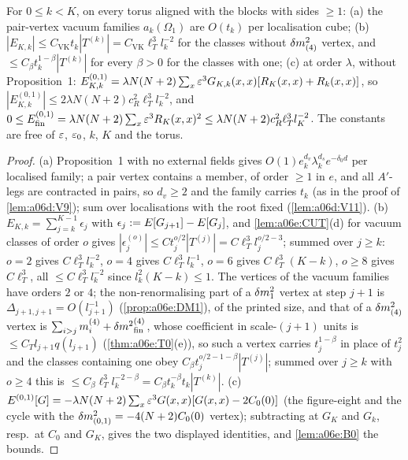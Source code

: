 \begin{theorem}\label{thm:a06e:VK}
For $0\le k<K$, on every torus aligned with the blocks with sides $\ge1$: \textup{(a)} the pair-vertex vacuum families $a_k(\Omega_1)$ are $O(t_k)$ per localisation cube; \textup{(b)} $|E_{K,k}|\le C_{\mathrm{VK}}t_k|T^{(k)}|=C_{\mathrm{VK}}\ell_T^3l_k^{-2}$ for the classes without $\delta m^2_{(4)}$ vertex, and $\le C_\beta t_k^{1-\beta}|T^{(k)}|$ for every $\beta>0$ for the classes with one; \textup{(c)} at order $\lambda$, without Proposition~1: $E^{(0,1)}_{K,k}=\lambda N(N+2)\sum_x\varepsilon^3G_{K,k}(x,x)[R_K(x,x)+R_k(x,x)]$, so $|E^{(0,1)}_{K,k}|\le2\lambda N(N+2)c_R^2\ell_T^3l_k^{-2}$, and $0\le E_{\mathrm{fin}}^{(0,1)}=\lambda N(N+2)\sum_x\varepsilon^3R_K(x,x)^2\le\lambda N(N+2)c_R^2\ell_T^3l_K^{-2}$. The constants are free of $\varepsilon$, $\varepsilon_0$, $k$, $K$ and the torus.
\end{theorem}

\begin{proof}
(a) Proposition~1 with no external fields gives $O(1)e_k^{d_v}\lambda_k^{d_s}e^{-\delta_0d}$ per localised family; a pair vertex contains a \cite[(1.14)]{Ba3} member, of order $\ge1$ in $e$, and all $A'$-legs are contracted in pairs, so $d_v\ge2$ and the family carries $t_k$ (as in the proof of \cref{lem:a06d:V9}); sum over localisations with the root fixed (\cref{lem:a06d:V11}). (b) $E_{K,k}=\sum_{j=k}^{K-1}\epsilon_j$ with $\epsilon_j:= E[G_{j+1}]-E[G_j]$, and \cref{lem:a06e:CUT}(d) for vacuum classes of order $o$ gives $|\epsilon^{(o)}_j|\le Ct_j^{o/2}|T^{(j)}|=C\ell_T^3l_j^{o/2-3}$; summed over $j\ge k$: $o=2$ gives $C\ell_T^3l_k^{-2}$, $o=4$ gives $C\ell_T^3l_k^{-1}$, $o=6$ gives $C\ell_T^3(K-k)$, $o\ge8$ gives $C\ell_T^3$, all $\le C\ell_T^3l_k^{-2}$ since $l_k^2(K-k)\le1$. The \cite[(1.7)]{Ba3} vertices of the vacuum families have orders $2$ or $4$; the non-renormalising part of a $\delta m^2_1$ vertex at step $j+1$ is $\Delta_{j+1,j+1}=O(l_{j+1}^{-1})$ (\cref{prop:a06e:DM1}), of the printed size, and that of a $\delta m^2_{(4)}$ vertex is $\sum_{i>j}m^{(4)}_i+{\delta m^2}^{(4)}_{\mathrm{fin}}$, whose coefficient in scale-$(j+1)$ units is $\le C_Tl_{j+1}q(l_{j+1})$ (\cref{thm:a06e:T0}(e)), so such a vertex carries $t_j^{1-\beta}$ in place of $t_j^2$ and the classes containing one obey $C_\beta t_j^{o/2-1-\beta}|T^{(j)}|$; summed over $j\ge k$ with $o\ge4$ this is $\le C_\beta\ell_T^3l_k^{-2-\beta}=C_\beta t_k^{-\beta}t_k|T^{(k)}|$. (c) $E^{(0,1)}[G]=-\lambda N(N+2)\sum_x\varepsilon^3G(x,x)[G(x,x)-2C_0(0)]$ (the figure-eight and the cycle with the $\delta m^2_{(0,1)}=-4(N+2)C_0(0)$ vertex); subtracting at $G_K$ and $G_k$, resp.\ at $C_0$ and $G_K$, gives the two displayed identities, and \cref{lem:a06e:B0} the bounds.
\end{proof}

